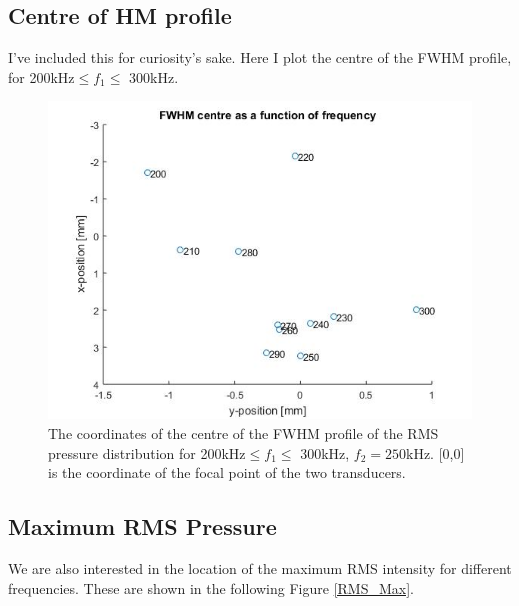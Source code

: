 \documentclass[10pt,a4paper]{article}
\begin{document}
\subsection*{Centre of HM profile}

I've included this for curiosity's sake. Here I plot the centre of the FWHM profile, for 200kHz$\leq f_1 \leq$ 300kHz.
\begin{figure}[H]\label{FWHM_centre}
\centering
\includegraphics[scale=0.6]{FWHM_centre}
\caption{The coordinates of the centre of the FWHM profile of the RMS pressure distribution for 200kHz$\leq f_1 \leq$ 300kHz, $f_2 = 250$kHz. [0,0] is the coordinate of the focal point of the two transducers.}
\end{figure}

\subsection*{Maximum RMS Pressure}

We are also interested in the location of the maximum RMS intensity for different frequencies. These are shown in the following Figure \ref{RMS_Max}. 
\end{document}
